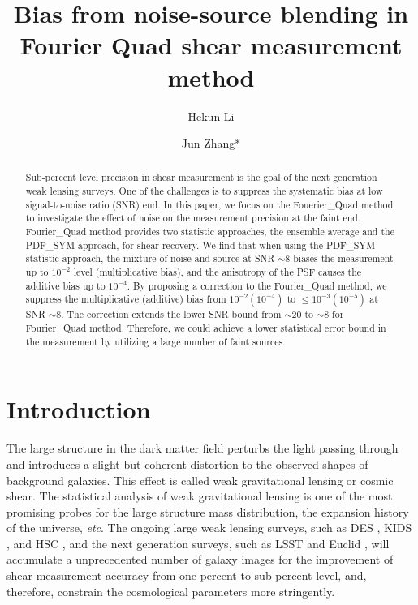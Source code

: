 \documentclass[twocolumn]{aastex62}
\def\etc{{\it etc}}
\begin{document}
\title{\textbf{Bias from noise-source blending in Fourier Quad shear measurement method}}



\author{Hekun Li}
\author{Jun Zhang*}


\begin{abstract}
Sub-percent level precision in shear measurement is the goal of the next generation weak lensing surveys. One of the challenges is to suppress the systematic bias at low signal-to-noise ratio (SNR) end. In this paper, we focus on the Fouerier\_Quad method to investigate the effect of noise on the measurement precision at the faint end. Fourier\_Quad method provides two statistic approaches, the ensemble average and the PDF\_SYM approach, for shear recovery. We find that when using the PDF\_SYM statistic approach, the mixture of noise and source at SNR $\sim 8$ biases the measurement up to $10^{-2}$ level (multiplicative bias), and the anisotropy of the PSF causes the additive bias up to $10^{-4}$. By proposing a correction to the Fourier\_Quad method, we suppress the multiplicative (additive) bias from $10^{-2} (10^{-4})$ to $\leq10^{-3} (10^{-5})$ at SNR $\sim8$. The correction extends the lower SNR bound from $\sim 20$ to $\sim 8$ for Fourier\_Quad method. Therefore, we could achieve a lower statistical error bound in the measurement by utilizing a large number of faint sources.


\end{abstract}




\section{Introduction} \label{sec:intro}

The large structure in the dark matter field perturbs the light passing through and introduces a slight but coherent distortion to the observed shapes of background galaxies. This effect is called weak gravitational lensing or cosmic shear. The statistical analysis of weak gravitational lensing is one of the most promising probes for the large structure mass distribution, the expansion history of the universe, \etc\citep{Bartelmann2001, Hoekastra2008, Kilbringer2015}. The ongoing large weak lensing surveys, such as DES \citep{Troxel2018}, KIDS \citep{Hildebrandt2016}, and HSC \citep{Hikage2019}, and the next generation surveys, such as LSST \citep{Abell2009} and Euclid \citep{Laureijs2011}, will accumulate a unprecedented number of galaxy images for the improvement of shear measurement accuracy from one percent to sub-percent level, and, therefore, constrain the cosmological parameters more stringently. 
\end{document}

